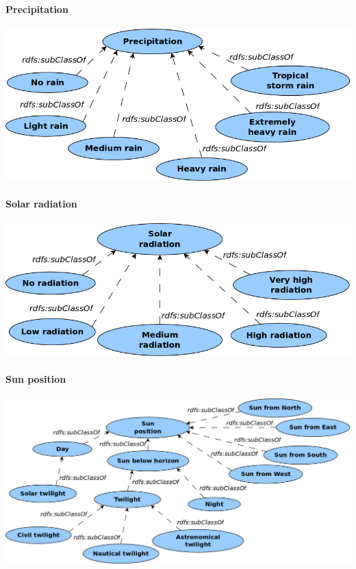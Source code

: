 \paragraph{Precipitation}

\begin{center}
  \includegraphics[width=.8\textwidth]{figures/diagrams/precipitation.png}
\end{center}

\paragraph{Solar radiation}

\begin{center}
  \includegraphics[width=.8\textwidth]{figures/diagrams/solar-radiation.png}
\end{center}

\paragraph{Sun position}

\begin{center}
  \includegraphics[width=.8\textwidth]{figures/diagrams/sun-position.png}
\end{center}

